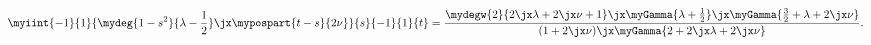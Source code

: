   \begin{equation}
      \myiint{-1}{1}{\mydeg{1-s^2}{\lambda-\frac{1}{2}}\jx
      \mypospart{t-s}{2\nu}}{s}{-1}{1}{t}
    =
    \frac{\mydegw{2}{2\jx\lambda+2\jx\nu+1}\jx
    \myGamma{\lambda+\frac{1}{2}}\jx\myGamma{\frac{3}{2}+\lambda+2\jx\nu}}
    {(1 + 2\jx\nu)\jx \myGamma{2+2\jx\lambda+2\jx\nu}}
.\label{eqn:spec_tv}
  \end{equation}
